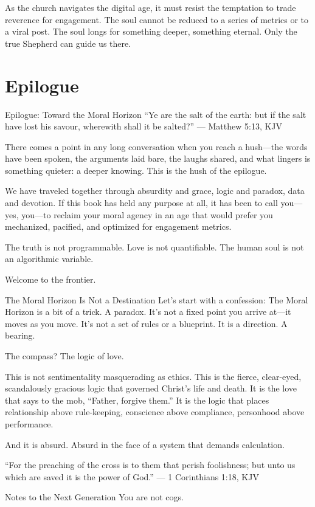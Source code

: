\documentclass[a4paper,11pt]{book}
\begin{document}
As the church navigates the digital age, it must resist the temptation to trade reverence for engagement. The soul cannot be reduced to a series of metrics or to a viral post. The soul longs for something deeper, something eternal. Only the true Shepherd can guide us there.

\chapter*{Epilogue}

Epilogue: Toward the Moral Horizon
“Ye are the salt of the earth: but if the salt have lost his savour, wherewith shall it be salted?” — Matthew 5:13, KJV

There comes a point in any long conversation when you reach a hush—the words have been spoken, the arguments laid bare, the laughs shared, and what lingers is something quieter: a deeper knowing. This is the hush of the epilogue.

We have traveled together through absurdity and grace, logic and paradox, data and devotion. If this book has held any purpose at all, it has been to call you—yes, you—to reclaim your moral agency in an age that would prefer you mechanized, pacified, and optimized for engagement metrics.

The truth is not programmable. Love is not quantifiable. The human soul is not an algorithmic variable.

Welcome to the frontier.

The Moral Horizon Is Not a Destination
Let’s start with a confession: The Moral Horizon is a bit of a trick. A paradox. It’s not a fixed point you arrive at—it moves as you move. It’s not a set of rules or a blueprint. It is a direction. A bearing.

The compass? The logic of love.

This is not sentimentality masquerading as ethics. This is the fierce, clear-eyed, scandalously gracious logic that governed Christ’s life and death. It is the love that says to the mob, “Father, forgive them.” It is the logic that places relationship above rule-keeping, conscience above compliance, personhood above performance.

And it is absurd. Absurd in the face of a system that demands calculation.

“For the preaching of the cross is to them that perish foolishness; but unto us which are saved it is the power of God.” — 1 Corinthians 1:18, KJV

Notes to the Next Generation
You are not cogs.
\end{document}
